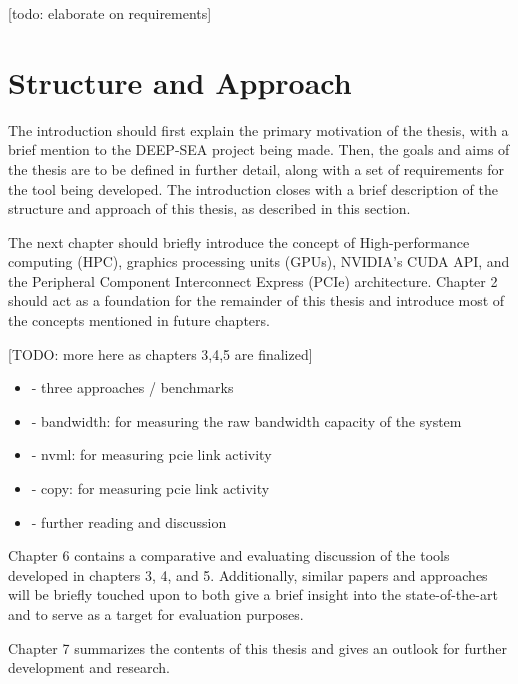[todo: elaborate on requirements]

\section{Structure and Approach}

The introduction should first explain the primary motivation of the thesis, with a brief mention to the DEEP-SEA project being made. Then, the goals and aims of the thesis are to be defined in further detail, along with a set of requirements for the tool being developed. The introduction closes with a brief description of the structure and approach of this thesis, as described in this section.

The next chapter should briefly introduce the concept of High-performance computing (HPC), graphics processing units (GPUs), NVIDIA's CUDA API, and the Peripheral Component Interconnect Express (PCIe) architecture. Chapter 2 should act as a foundation for the remainder of this thesis and introduce most of the concepts mentioned in future chapters.

[TODO: more here as chapters 3,4,5 are finalized]
\begin{itemize}
	\item - three approaches / benchmarks
	\item - bandwidth: for measuring the raw bandwidth capacity of the system
	\item - nvml: for measuring pcie link activity
	\item - copy: for measuring pcie link activity
	\item - further reading and discussion 
\end{itemize}

Chapter 6 contains a comparative and evaluating discussion of the tools developed in chapters 3, 4, and 5. Additionally, similar papers and approaches will be briefly touched upon to both give a brief insight into the state-of-the-art and to serve as a target for evaluation purposes.

Chapter 7 summarizes the contents of this thesis and gives an outlook for further development and research.



